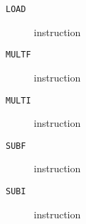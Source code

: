 \clearpage
\begin{description}
\item[\texttt{LOAD}] instruction\\

\end{description}
\clearpage
\begin{description}
\item[\texttt{MULTF}] instruction\\

\end{description}
\clearpage
\begin{description}
\item[\texttt{MULTI}] instruction\\

\end{description}
\clearpage
\begin{description}
\item[\texttt{SUBF}] instruction\\

\end{description}
\clearpage
\begin{description}
\item[\texttt{SUBI}] instruction\\

\end{description}
\clearpage
